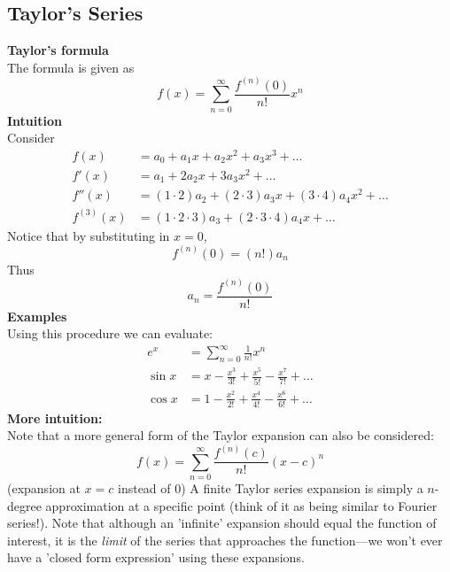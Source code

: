 \documentclass{report}
\begin{document}
\subsection{Taylor's Series} %
\textbf{Taylor's formula}\\
The formula is given as
\begin{equation*}
f(x)=\sum^\infty_{n=0}\frac{f^{(n)}(0)}{n!}x^n
\end{equation*}
\textbf{Intuition}\\
Consider
\begin{align*}
f(x)&=a_0+a_1x+a_2x^2+a_3x^3+\ldots\\
f'(x)&=a_1+2a_2x+3a_3x^2+\ldots\\
f''(x)&=(1\cdot2)a_2+(2\cdot3)a_3x+(3\cdot4)a_4x^2+\ldots\\
f^{(3)}(x)&=(1\cdot2\cdot3)a_3+(2\cdot3\cdot4)a_4x+\ldots
\end{align*}
Notice that by substituting in $x=0$, 
\begin{equation*}
f^{(n)}(0)=(n!)a_n
\end{equation*}
Thus
\begin{equation*}
a_n=\frac{f^{(n)}(0)}{n!}
\end{equation*}
\textbf{Examples}\\
Using this procedure we can evaluate:
\begin{align*}
e^x&=\sum^{\infty}_{n=0}\frac{1}{n!}x^n\\
\sin x&=x-\frac{x^3}{3!}+\frac{x^5}{5!}-\frac{x^7}{7!}+\ldots\\
\cos x&=1-\frac{x^2}{2!}+\frac{x^4}{4!}-\frac{x^6}{6!}+\ldots
\end{align*}
\textbf{More intuition:}\\
Note that a more general form of the Taylor expansion can also be considered:
\begin{equation*}
f(x)=\sum_{n=0}^\infty\frac{f^{(n)}(c)}{n!}(x-c)^n
\end{equation*}
(expansion at $x=c$ instead of 0)
A finite Taylor series expansion is simply a $n$-degree approximation at a specific point (think of it as being similar to Fourier series!).
Note that although an 'infinite' expansion should equal the function of interest, it is the \textit{limit} of the series that approaches 
the function---we won't ever have a 'closed form expression' using these expansions. 
\newpage
\end{document}
